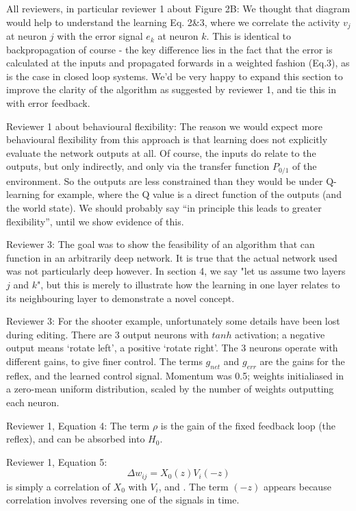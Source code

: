 \documentclass{article}
\begin{document}
All reviewers, in particular reviewer 1 about Figure 2B: We thought
that diagram would help to understand the learning Eq. 2\&3, where we
correlate the activity $v_{j}$ at neuron $j$ with the error signal
$e_{k}$ at neuron $k$. This is identical to backpropagation of course
- the key difference lies in the fact that the error is calculated at
the inputs and propagated forwards in a weighted fashion (Eq.3), as is the
case in closed loop systems. We'd be very happy to expand this section to
improve the clarity of the algorithm as suggested by reviewer 1, and tie
this in with error feedback.
			
Reviewer 1 about behavioural flexibility:
The reason we would expect more behavioural flexibility from this
approach is that learning does not explicitly evaluate the network
outputs at all. Of course, the inputs do relate to the outputs, but
only indirectly, and only via the transfer function $P_{0/1}$ of the
environment. So the outputs are less constrained than they would be
under Q-learning for example, where the Q value is a direct function
of the outputs (and the world state). We should probably say ``in
principle this leads to greater flexibility'', until we show evidence
of this.
	
Reviewer 3: The goal was to show the feasibility of an algorithm that can function
in an arbitrarily deep network. It is true that the actual network
used was not particularly deep however. In section 4, we say "let us
assume two layers $j$ and $k$", but this is merely to illustrate how
the learning in one layer relates to its neighbouring layer to demonstrate
a novel concept.
	
Reviewer 3: For the shooter example, unfortunately some details have been lost
during editing. There are 3 output neurons with $tanh$ activation; a
negative output means ‘rotate left’, a positive ‘rotate right’. The 3
neurons operate with different gains, to give finer control. The terms
$g_{net}$ and $g_{err}$ are the gains for the reflex, and the learned
control signal.  Momentum was 0.5; weights initialiased in a zero-mean
uniform distribution, scaled by the number of weights outputting each
neuron.
	
Reviewer 1, Equation 4: The term $\rho$ is the gain of the fixed feedback loop
(the reflex), and can be absorbed into $H_{0}$.
	
Reviewer 1, Equation 5:
\begin{equation}
\Delta w_{ij} = X_0(z) V_i(-z) \nonumber
\end{equation}
is simply a correlation of $X_{0}$ with $V_{i}$, and . The term $(-z)$
appears because correlation involves reversing one of the signals in
time.

	
\end{document}
